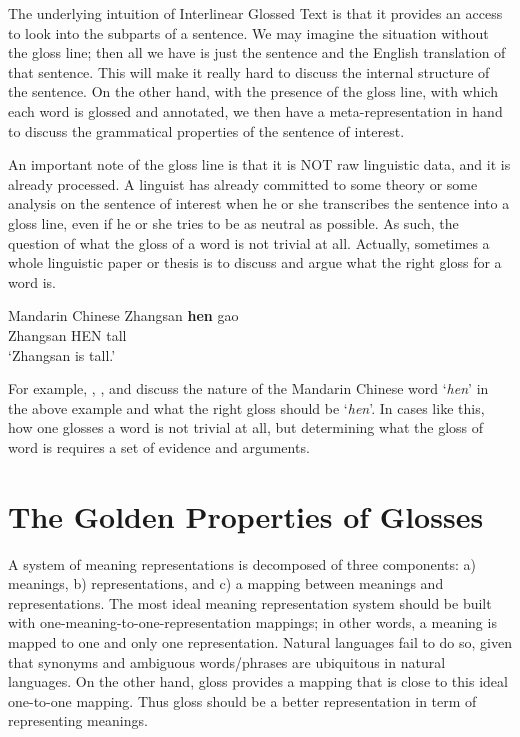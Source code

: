 \documentclass[final]{ua-thesis}
\numberwithin{equation}{section}
\begin{document}
The underlying intuition of Interlinear Glossed Text is that it provides an access to look into the subparts of a sentence. We may imagine the situation without the gloss line; then all we have is just the sentence and the English translation of that sentence. This will make it really hard to discuss the internal structure of the sentence. On the other hand, with the presence of the gloss line, with which each word is glossed and annotated, we then have a meta-representation in hand to discuss the grammatical properties of the sentence of interest.  
 
An important note of the gloss line is that it is NOT raw linguistic data, and it is already processed. A linguist has already committed to some theory or some analysis on the sentence of interest when he or she transcribes the sentence into a gloss line, even if he or she tries to be as neutral as possible. As such, the question of what the gloss of a word is not trivial at all. Actually, sometimes a whole linguistic paper or thesis is to discuss and argue what the right gloss for a word is.  

\begin{exe}  
\ex Mandarin Chinese
	\gll   Zhangsan \textbf{hen} gao\\
     	   Zhangsan HEN tall\\
    \glt   `Zhangsan is tall.'  
\end{exe}  

For example, \citet{grano2008mandarin}, \citet{Chen2010}, and \citet{liu2010positive} discuss the nature of the Mandarin Chinese word `\textit{hen}' in the above example and what the right gloss should be `\textit{hen}'. In cases like this, how one glosses a word is not trivial at all, but determining what the gloss of word is requires a set of evidence and arguments. 

\section{The Golden Properties of Glosses}

A system of meaning representations is decomposed of three components: a) meanings, b) representations, and c) a mapping between meanings and representations. The most ideal meaning representation system should be built with one-meaning-to-one-representation mappings; in other words, a meaning is mapped to one and only one representation. Natural languages fail to do so, given that synonyms and ambiguous words/phrases are ubiquitous in natural languages. On the other hand, gloss provides a mapping that is close to this ideal one-to-one mapping. Thus gloss should be a better representation in term of representing meanings. 
\end{document}
